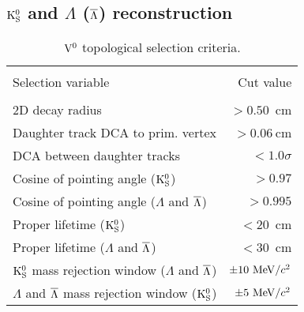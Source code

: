 \subsection{${\rm K}_{\rm S}^{0}$ and $\Lambda$ ($\overline{\Lambda}$) reconstruction}
\label{sec:V0Reco}

\begin{table}[t]
\centering
\begin{tabular*}{\linewidth}{@{\extracolsep{\fill}}lr}
\hline
& \\ [-0.7em]
Selection variable & Cut value \\ [0.3em]
\hline
& \\ [-0.7em]
2D decay radius                                    & $>0.50$~cm   \\[0.3em]
Daughter track DCA to prim. vertex                 & $>0.06~$cm   \\[0.3em]
DCA between daughter tracks                        & $<1.0\sigma$ \\[0.3em]
Cosine of pointing angle (${\rm K}_{\rm S}^{0}$)               & $>0.97$      \\[0.3em]
Cosine of pointing angle ($\Lambda$ and $\overline{\Lambda}$) & $>0.995$     \\[0.3em]
Proper lifetime (${\rm K}_{\rm S}^{0}$)                        & $<20$~cm     \\[0.3em]
Proper lifetime ($\Lambda$ and $\overline{\Lambda}$)          & $<30$~cm     \\[0.3em]   
${\rm K}_{\rm S}^{0}$ mass rejection window ($\Lambda$ and $\overline{\Lambda}$) & $\pm 10~{\rm MeV/}c^{2}$ \\[0.3em]
$\Lambda$ and $\overline{\Lambda}$ mass rejection window (${\rm K}_{\rm S}^{0}$) & $\pm 5~{\rm MeV/}c^{2}$  \\[0.3em]
\hline
\end{tabular*}
\caption{${\rm V}^{0}$ topological selection criteria.}
\label{tab:c05V0cuts}
\end{table}

